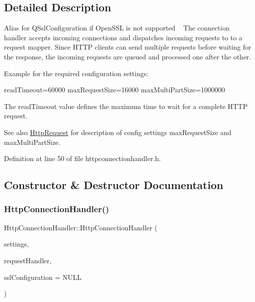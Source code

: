 \subsection{Detailed Description}
Alias for Q\+Ssl\+Configuration if Open\+S\+SL is not supported ~\newline
The connection handler accepts incoming connections and dispatches incoming requests to to a request mapper. Since H\+T\+TP clients can send multiple requests before waiting for the response, the incoming requests are queued and processed one after the other. 

Example for the required configuration settings\+: {\ttfamily 
\begin{DoxyPre}
readTimeout=60000
maxRequestSize=16000
maxMultiPartSize=1000000
\end{DoxyPre}
} 

The read\+Timeout value defines the maximum time to wait for a complete H\+T\+TP request. \begin{DoxySeeAlso}{See also}
\mbox{\hyperlink{classstefanfrings_1_1_http_request}{Http\+Request}} for description of config settings max\+Request\+Size and max\+Multi\+Part\+Size. 
\end{DoxySeeAlso}


Definition at line 50 of file httpconnectionhandler.\+h.



\subsection{Constructor \& Destructor Documentation}
\mbox{\label{classstefanfrings_1_1_http_connection_handler_a7d60c4a8f80eaeab436adba6e8d529d3}} 
\subsubsection{\texorpdfstring{Http\+Connection\+Handler()}{HttpConnectionHandler()}}
{\footnotesize\ttfamily Http\+Connection\+Handler\+::\+Http\+Connection\+Handler (\begin{DoxyParamCaption}\item[{Q\+Settings $\ast$}]{settings,  }\item[{\mbox{\hyperlink{classstefanfrings_1_1_http_request_handler}{Http\+Request\+Handler}} $\ast$}]{request\+Handler,  }\item[{Q\+Ssl\+Configuration $\ast$}]{ssl\+Configuration = {\ttfamily NULL} }\end{DoxyParamCaption})}

